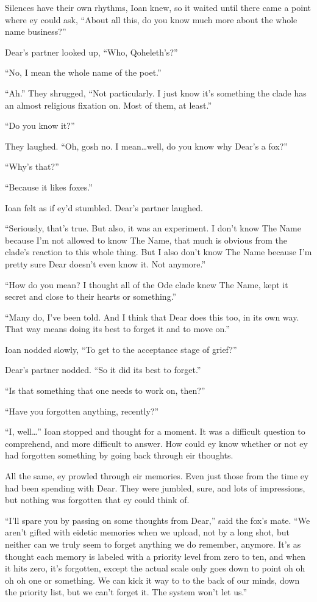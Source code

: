 Silences have their own rhythms, Ioan knew, so it waited until there came a point where ey could ask, ``About all this, do you know much more about the whole name business?''

Dear's partner looked up, ``Who, Qoheleth's?''

``No, I mean the whole name of the poet.''

``Ah.'' They shrugged, ``Not particularly. I just know it's something the clade has an almost religious fixation on. Most of them, at least.''

``Do you know it?''

They laughed. ``Oh, gosh no. I mean\ldots{}well, do you know why Dear's a fox?''

``Why's that?''

``Because it likes foxes.''

Ioan felt as if ey'd stumbled. Dear's partner laughed.

``Seriously, that's true. But also, it was an experiment. I don't know The Name because I'm not allowed to know The Name, that much is obvious from the clade's reaction to this whole thing. But I also don't know The Name because I'm pretty sure Dear doesn't even know it. Not anymore.''

``How do you mean? I thought all of the Ode clade knew The Name, kept it secret and close to their hearts or something.''

``Many do, I've been told. And I think that Dear does this too, in its own way. That way means doing its best to forget it and to move on.''

Ioan nodded slowly, ``To get to the acceptance stage of grief?''

Dear's partner nodded. ``So it did its best to forget.''

``Is that something that one needs to work on, then?''

``Have you forgotten anything, recently?''

``I, well\ldots{}'' Ioan stopped and thought for a moment. It was a difficult question to comprehend, and more difficult to answer. How could ey know whether or not ey had forgotten something by going back through eir thoughts.

All the same, ey prowled through eir memories. Even just those from the time ey had been spending with Dear. They were jumbled, sure, and lots of impressions, but nothing was forgotten that ey could think of.

``I'll spare you by passing on some thoughts from Dear,'' said the fox's mate. ``We aren't gifted with eidetic memories when we upload, not by a long shot, but neither can we truly seem to forget anything we do remember, anymore. It's as thought each memory is labeled with a priority level from zero to ten, and when it hits zero, it's forgotten, except the actual scale only goes down to point oh oh oh oh one or something. We can kick it way to to the back of our minds, down the priority list, but we can't forget it. The system won't let us.''

